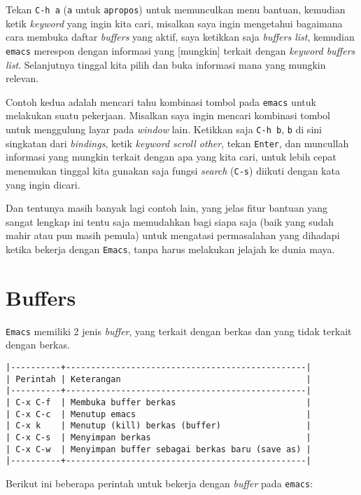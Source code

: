 \documentclass{article}
\begin{document}
Tekan \verb=C-h a= (\verb=a= untuk \verb=apropos=) untuk memunculkan 
menu bantuan, kemudian ketik \emph{keyword} yang ingin kita cari, 
misalkan saya ingin mengetahui bagaimana cara membuka daftar 
\emph{buffers} yang aktif, saya ketikkan saja \emph{buffers list}, 
kemudian \verb=emacs= merespon dengan informasi yang [mungkin] terkait 
dengan \emph{keyword buffers list}. Selanjutnya tinggal kita pilih dan
buka informasi mana yang mungkin relevan.

Contoh kedua adalah mencari tahu kombinasi tombol pada \verb=emacs= untuk
melakukan suatu pekerjaan. Misalkan saya ingin mencari kombinasi tombol untuk
menggulung layar pada \emph{window} lain. Ketikkan saja \verb=C-h b=,
\verb=b= di sini singkatan dari \emph{bindings}, ketik 
\emph{keyword scroll other}, tekan \verb=Enter=, dan muncullah informasi
yang mungkin terkait dengan apa yang kita cari, untuk lebih cepat menemukan
tinggal kita gunakan saja fungsi \emph{search} (\verb=C-s=) diikuti dengan
kata yang ingin dicari.

Dan tentunya masih banyak lagi contoh lain, yang jelas fitur bantuan yang 
sangat lengkap ini tentu saja memudahkan bagi siapa saja (baik yang sudah
mahir atau pun masih pemula) untuk mengatasi permasalahan yang dihadapi
ketika bekerja dengan \verb=Emacs=, tanpa harus melakukan jelajah ke 
dunia maya.

\section{Buffers}
\verb=Emacs= memiliki 2 jenis \emph{buffer}, yang terkait dengan berkas dan
yang tidak terkait dengan berkas.

\begin{verbatim}
|----------+------------------------------------------------|
| Perintah | Keterangan                                     |
|----------+------------------------------------------------|
| C-x C-f  | Membuka buffer berkas                          |
| C-x C-c  | Menutup emacs                                  |
| C-x k    | Menutup (kill) berkas (buffer)                 |
| C-x C-s  | Menyimpan berkas                               |
| C-x C-w  | Menyimpan buffer sebagai berkas baru (save as) |
|----------+------------------------------------------------|
\end{verbatim}

Berikut ini beberapa perintah untuk bekerja dengan \emph{buffer} pada 
\verb=emacs=:
\end{document}
